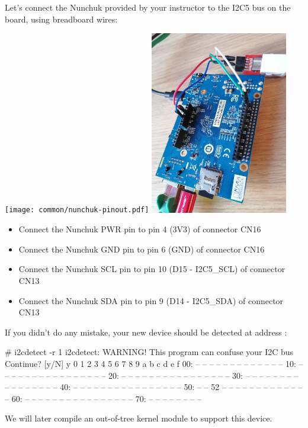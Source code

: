 Let's connect the Nunchuk provided by your instructor
to the I2C5 bus on the board, using breadboard wires:

\texttt{[image: common/nunchuk-pinout.pdf]}
\includegraphics[width=6cm]{labs/sysdev-accessing-hardware/dk1-board-nunchuk-connected.jpg}

\begin{itemize}
\item Connect the Nunchuk PWR pin to pin 4 (3V3) of connector CN16
\item Connect the Nunchuk GND pin to pin 6 (GND) of connector CN16
\item Connect the Nunchuk SCL pin to pin 10 (D15 - I2C5\_SCL) of connector CN13
\item Connect the Nunchuk SDA pin to pin 9 (D14 - I2C5\_SDA) of connector CN13
\end{itemize}

If you didn't do any mistake, your new device should be detected at
address :

\begin{bashinput}
# i2cdetect -r 1
i2cdetect: WARNING! This program can confuse your I2C bus
Continue? [y/N] y
     0  1  2  3  4  5  6  7  8  9  a  b  c  d  e  f
00:          -- -- -- -- -- -- -- -- -- -- -- -- --
10: -- -- -- -- -- -- -- -- -- -- -- -- -- -- -- --
20: -- -- -- -- -- -- -- -- -- -- -- -- -- -- -- --
30: -- -- -- -- -- -- -- -- -- -- -- -- -- -- -- --
40: -- -- -- -- -- -- -- -- -- -- -- -- -- -- -- --
50: -- -- 52 -- -- -- -- -- -- -- -- -- -- -- -- --
60: -- -- -- -- -- -- -- -- -- -- -- -- -- -- -- --
70: -- -- -- -- -- -- -- --
\end{bashinput}

We will later compile an out-of-tree kernel module to support this device.

